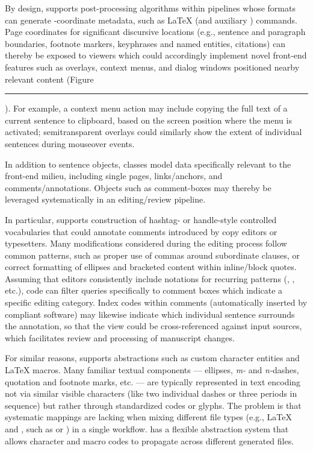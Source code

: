 \documentclass[11pt]{article}
\newcommand\reduline{\bgroup\markoverwith
{\textcolor{ru}{\rule[-.25ex]{3pt}{3.4pt}}}\ULon}
\DeclareRobustCommand{\xfigunderline}[1]{\reduline{#1}
\llap{\dashuline{\phantom{#1}}}%
}
\renewcommand{\Atref}[1]{\textcolor{rgrAt!30}{\xfigunderline{\hspace{-2pt}\autoref{#1}\hspace*{-2pt}}}}
\begin{document}
{{\begin{description}
\pseudoIndent{} By design, \PacTk{} supports post-processing 
algorithms within pipelines whose formats can generate 
\PDF{}-coordinate metadata, such as \LaTeX{} 
 (and auxiliary ) commands.  
Page coordinates for significant discursive locations 
(e.g., sentence and paragraph boundaries, footnote markers, 
keyphrases and named entities, citations) can thereby be 
exposed to \PDF{} viewers which could accordingly implement 
novel front-end features such as overlays, context menus, 
and dialog windows positioned nearby relevant content 
(Figure~\Atref{fig:ss2}).  
For example, a context menu action may include copying the 
full text of a current sentence to clipboard, based on the 
screen position where the menu is activated; semitransparent 
overlays could similarly show the extent of individual 
sentences during mouseover events.
  
\item[PDF Comments and Annotations]  In addition to sentence 
objects, \PacTk{} classes model data specifically relevant to 
the \PDF{} front-end milieu, including single pages, links/anchors, and 
comments/annotations.  Objects such as comment-boxes 
may thereby be leveraged systematically in an editing/review pipeline.

\pseudoIndent{} In particular, \PacTk{} supports construction of hashtag- or handle-style 
controlled vocabularies that could annotate \PDF{} comments 
introduced by copy editors or typesetters.  Many modifications considered 
during the editing process follow common patterns, such as 
proper use of commas around subordinate clauses, or correct formatting 
of ellipses and bracketed content within inline/block quotes.  Assuming 
that editors consistently include notations for recurring patterns 
(, , etc.), 
\PacTk{} code can filter queries specifically to \PDF{} comment 
boxes which indicate a specific editing category.  Index codes within 
\PDF{} comments (automatically inserted by compliant software) 
may likewise indicate which individual sentence 
surrounds the annotation, so that the \PDF{} view could be cross-referenced 
against input sources, which facilitates review and processing 
of manuscript changes.


\pseudoIndent{} For similar reasons, \PacTk{} supports abstractions 
such as \XML{} custom character entities and \LaTeX{} macros.  
Many familiar textual components --- ellipses, 
\textit{m-} and \textit{n-}dashes, 
quotation and footnote marks, etc. --- are typically represented 
in text encoding not via similar visible characters (like two individual dashes 
or three periods in sequence) but rather through standardized 
codes or glyphs.  The problem is that systematic mappings 
are lacking when mixing different file types (e.g., \LaTeX{} and 
\XML{}, such as \JATS{} or \BITS{}) in a single workflow.  
\lPacTk{} has a flexible abstraction system that allows 
character and macro codes to propagate across different 
generated files.



\end{description}}}
\end{document}
